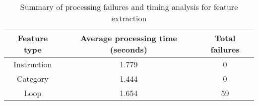 \begin{center}
\begin{table}[H]
\begin{tabular}{c|cc}
\textbf{Feature type} & \textbf{Average processing time (seconds)} & \textbf{Total failures}\\
\hline
Instruction & 1.779 & 0\\
Category & 1.444 & 0\\
Loop & 1.654 & 59
\end{tabular}
\label{featureprocessing}
\caption{Summary of processing failures and timing analysis for feature extraction}
\end{table}
\end{center}

